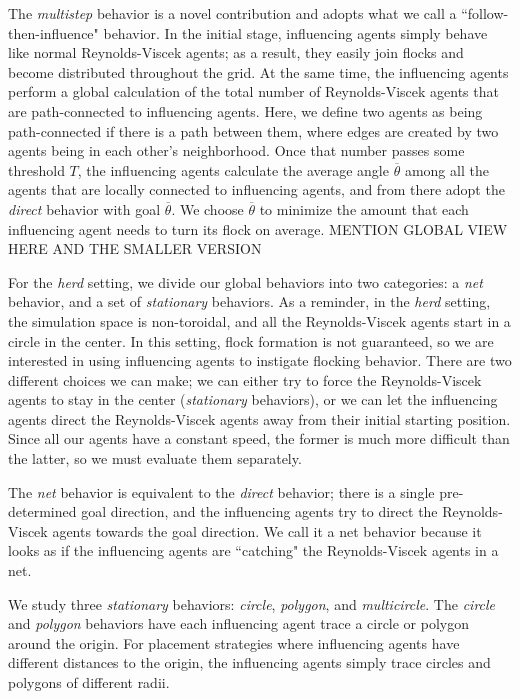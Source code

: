 The \textit{multistep} behavior is a novel contribution and adopts what we call
a ``follow-then-influence" behavior.
In the initial stage, influencing agents simply behave like normal Reynolds-Viscek
agents; as a result, they easily join flocks and become distributed throughout
the grid.
At the same time, the influencing agents perform a global calculation of the
total number of Reynolds-Viscek agents that are path-connected to influencing
agents.
Here, we define two agents as being path-connected if there is a path between
them, where edges are created by two agents being in each other's neighborhood.
Once that number passes some threshold $T$, the influencing agents calculate
the average angle $\overline{\theta}$ among all the agents that are locally
connected to influencing agents, and from there adopt the \textit{direct}
behavior with goal $\overline{\theta}$.
We choose $\overline{\theta}$ to minimize the amount that each influencing
agent needs to turn its flock on average.
MENTION GLOBAL VIEW HERE AND THE SMALLER VERSION

For the \textit{herd} setting, we divide our global behaviors into two
categories: a \textit{net} behavior, and a set of \textit{stationary} behaviors.
As a reminder, in the \textit{herd} setting, the simulation space is
non-toroidal, and all the Reynolds-Viscek agents start in a circle in the
center.
In this setting, flock formation is not guaranteed, so we are interested in
using influencing agents to instigate flocking behavior.
There are two different choices we can make; we can either try to force the
Reynolds-Viscek agents to stay in the center (\textit{stationary} behaviors),
or we can let the influencing agents direct the Reynolds-Viscek agents away
from their initial starting position.
Since all our agents have a constant speed, the former is much more difficult
than the latter, so we must evaluate them separately.

The \textit{net} behavior is equivalent to the \textit{direct} behavior; there
is a single pre-determined goal direction, and the influencing agents try to
direct the Reynolds-Viscek agents towards the goal direction.
We call it a net behavior because it looks as if the influencing agents are
``catching" the Reynolds-Viscek agents in a net.

We study three \textit{stationary} behaviors: \textit{circle}, \textit{polygon},
and \textit{multicircle}.
The \textit{circle} and \textit{polygon} behaviors have each influencing agent
trace a circle or polygon around the origin.
For placement strategies where influencing agents have different distances to
the origin, the influencing agents simply trace circles and polygons of
different radii.

